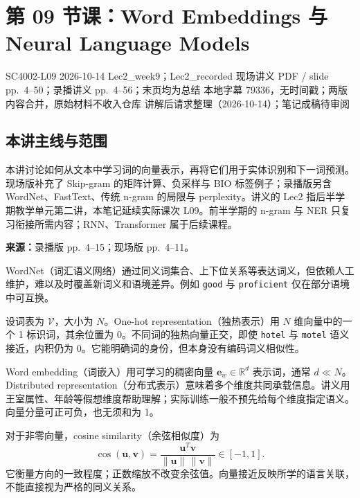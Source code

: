 
\section{第 09 节课：Word Embeddings 与 Neural Language Models}
\label{lecture:SC4002-L09}

\lecturemeta
  {SC4002-L09}
  {2026-10-14}
  {Lec2\_week9；Lec2\_recorded}
  {现场讲义 PDF / slide pp.~4--50；录播讲义 pp.~4--56；末页均为总结}
  {本地字幕 79336，无时间戳；两版内容合并，原始材料不收入仓库}
  {讲解后请求整理（2026-10-14）；笔记成稿待审阅}

\subsection{本讲主线与范围}

本讲讨论如何从文本中学习词的向量表示，再将它们用于实体识别和下一词预测。现场版补充了 Skip-gram 的矩阵计算、负采样与 BIO 标签例子；录播版另含 WordNet、FastText、传统 n-gram 的局限与 perplexity。讲义的 Lec2 指后半学期教学单元第二讲，本笔记延续实际课次 L09。前半学期的 n-gram 与 NER 只复习衔接所需内容；RNN、Transformer 属于后续课程。

\nopagebreak[4]

\textbf{来源：}录播版 pp.~4--15；现场版 pp.~4--11。
\nopagebreak[4]

WordNet（词汇语义网络）通过同义词集合、上下位关系等表达词义，但依赖人工维护，难以及时覆盖新词义和语境差异。例如 \texttt{good} 与 \texttt{proficient} 仅在部分语境中可互换。

设词表为 $\mathcal V$，大小为 $N$。One-hot representation（独热表示）用 $N$ 维向量中的一个 1 标识词，其余位置为 0。不同词的独热向量正交，即使 \texttt{hotel} 与 \texttt{motel} 语义接近，内积仍为 0。它能明确词的身份，但本身没有编码词义相似性。

Word embedding（词嵌入）用可学习的稠密向量 $\mathbf e_w\in\mathbb R^d$ 表示词，通常 $d\ll N$。Distributed representation（分布式表示）意味着多个维度共同承载信息。讲义用王室属性、年龄等假想维度帮助理解；实际训练一般不预先给每个维度指定语义。向量分量可正可负，也无须和为 1。

对于非零向量，cosine similarity（余弦相似度）为
\[
  \cos(\mathbf u,\mathbf v)
  =\frac{\mathbf u^T\mathbf v}{\|\mathbf u\|\,\|\mathbf v\|}\in[-1,1].
\]
它衡量方向的一致程度；正数缩放不改变余弦值。向量接近反映所学的语言关联，不能直接视为严格的同义关系。

